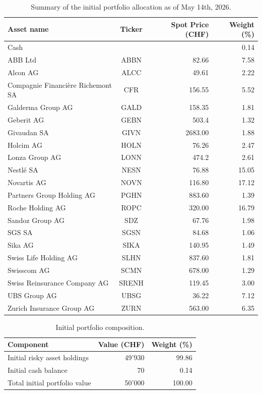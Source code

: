 \begin{table}[!htbp]
    \centering
    \begin{tabular}{lcrr}
        \toprule
        Asset name & Ticker & Spot Price (CHF) & Weight (\%) \\
        \midrule
        Cash & & & 0.14 \\
        ABB Ltd & ABBN & 82.66 & 7.58 \\
        Alcon AG & ALCC & 49.61 & 2.22 \\
        Compagnie Financière Richemont SA & CFR & 156.55 & 5.52 \\
        Galderma Group AG & GALD & 158.35 & 1.81 \\
        Geberit AG & GEBN & 503.4 & 1.32 \\
        Givaudan SA & GIVN & 2683.00 & 1.88 \\
        Holcim AG & HOLN & 76.26 & 2.47 \\
        Lonza Group AG & LONN & 474.2 & 2.61 \\
        Nestlé SA & NESN & 76.88 & 15.05 \\
        Novartis AG & NOVN & 116.80 & 17.12 \\
        Partners Group Holding AG & PGHN & 883.60 & 1.39 \\
        Roche Holding AG & ROPC & 320.00 & 16.79 \\
        Sandoz Group AG & SDZ & 67.76 & 1.98 \\
        SGS SA & SGSN & 84.68 & 1.06 \\
        Sika AG & SIKA & 140.95 & 1.49 \\
        Swiss Life Holding AG & SLHN & 837.60 & 1.81 \\
        Swisscom AG & SCMN & 678.00 & 1.29 \\
        Swiss Reinsurance Company AG & SRENH & 119.45 & 3.00 \\
        UBS Group AG & UBSG & 36.22 & 7.12 \\
        Zurich Insurance Group AG & ZURN & 563.00 & 6.35 \\
        \bottomrule
    \end{tabular}
    \caption{Summary of the initial portfolio allocation as of May 14th, 2026.}
    \label{tab: initial portfolio weights}
\end{table}

\begin{table}[!htbp]
    \centering
    \begin{tabular}{lrr}
        \toprule
        Component & Value (CHF) & Weight (\%) \\
        \midrule
        Initial risky asset holdings & 49'930 & 99.86 \\
        Initial cash balance & 70 & 0.14 \\
        Total initial portfolio value & 50'000 & 100.00 \\
        \bottomrule
    \end{tabular}
    \caption{Initial portfolio composition.}
    \label{tab: initial portfolio}
\end{table}


